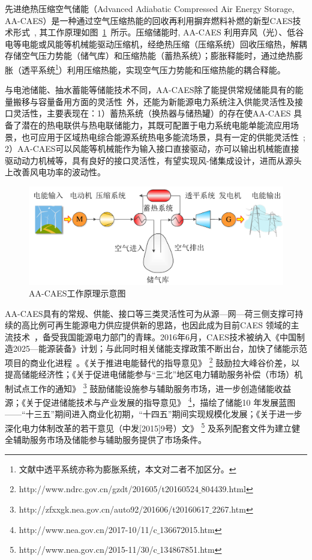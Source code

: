 先进绝热压缩空气储能（Advanced Adiabatic Compressed Air Energy Storage, AA-CAES）是一种通过空气压缩热能的回收再利用摒弃燃料补燃的新型CAES技术形式~\cite{ACAES-Green-12}, 其工作原理如图~\ref{fig:AA-CAES-principle-abs}~所示。压缩储能时, AA-CAES 利用弃风（光）、低谷电等电能或风能等机械能驱动压缩机，经绝热压缩（压缩系统）回收压缩热，解耦存储空气压力势能（储气库）和压缩热能（蓄热系统）；膨胀释能时，通过绝热膨胀（透平系统\footnote{文献中透平系统亦称为膨胀系统，本文对二者不加区分。}）利用压缩热能，实现空气压力势能和压缩热能的耦合释能。

与电池储能、抽水蓄能等储能技术不同，AA-CAES除了能提供常规储能具有的能量搬移与容量备用方面的灵活性~\cite{CAES-Baseload-Review-12,CAES-Reserve-11}外，还能为新能源电力系统注入供能灵活性及接口灵活性，主要表现在：1）蓄热系统（换热器与储热罐）的存在使AA-CAES 具备了潜在的热电联供与热电联储能力，其既可配置于电力系统电能单能流应用场景，也可应用于区域热电综合能源系统热电多能流场景，具有一定的供能灵活性~\cite{CAES-Review-18-Rui-operation,CAES-Review-16-Polygeneration}; 2）AA-CAES可以风能等机械能作为输入接口直接驱动，亦可以输出机械能直接驱动动力机械等，具有良好的接口灵活性，有望实现风-储集成设计，进而从源头上改善风电功率的波动性。

\begin{figure}[H] %
  \centering
  \includegraphics[scale=0.60]{figures/Chap1-1-AA-CAES-Principle-Abs.pdf}
  \caption{AA-CAES工作原理示意图}
  \label{fig:AA-CAES-principle-abs}
\end{figure}

AA-CAES具有的常规、供能、接口等三类灵活性可为从源—网—荷三侧支撑可持续的高比例可再生能源电力供应提供新的思路，也因此成为目前CAES 领域的主流技术~\cite{AA-CAES-04,AA-CAES-07}，备受我国能源电力部门的青睐。2016年6月，CAES技术被纳入《中国制造2025—能源装备》计划；与此同时相关储能支撑政策不断出台，加快了储能示范项目的商业化进程~\cite{ESS-CESA-16,ESS-CIAPS-16}。《关于推进电能替代的指导意见》
\footnote{http://www.ndrc.gov.cn/gzdt/201605/t20160524$\_$804439.html} 鼓励拉大峰谷价差，以提高储能经济性；《关于促进电储能参与“三北”地区电力辅助服务补偿（市场）机制试点工作的通知》
\footnote{http://zfxxgk.nea.gov.cn/auto92/201606/t20160617$\_$2267.htm} 鼓励储能设施参与辅助服务市场，进一步创造储能收益源；《关于促进储能技术与产业发展的指导意见》
\footnote{http://www.nea.gov.cn/2017-10/11/c$\_$136672015.htm}，描绘了储能10 年发展蓝图——“十三五”期间进入商业化初期，“十四五”期间实现规模化发展；《关于进一步深化电力体制改革的若干意见（中发[2015]9号）文》
\footnote{http://www.nea.gov.cn/2015-11/30/c$\_$134867851.htm} 及系列配套文件为建立健全辅助服务市场及储能参与辅助服务提供了市场条件。

